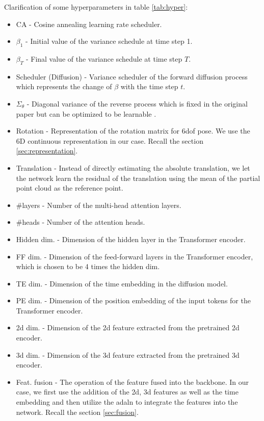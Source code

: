 \documentclass[12pt,DIV14,BCOR12mm,a4paper,footinclude=false,headinclude,parskip=half-,twoside,openright,cleardoublepage=empty,toc=index,bibliography=totoc,listof=totoc]{scrreprt}
\numberwithin{equation}{chapter}
\begin{document}
Clarification of some hyperparameters in table \ref{tab:hyper}:
\begin{itemize}
  \item CA - Cosine annealing learning rate scheduler.
  \item $\beta_{1}$ - Initial value of the variance schedule at time step 1.
  \item $\beta_{T}$ - Final value of the variance schedule at time step $T$.
  \item Scheduler (Diffusion) - Variance scheduler of the forward diffusion process which represents the change of $\beta$ with the time step $t$.
  \item $\Sigma_{\theta}$ - Diagonal variance of the reverse process which is fixed in the original paper \cite{ho2020denoising} but can be optimized to be learnable \cite{nichol2021improved}.
  \item Rotation - Representation of the rotation matrix for \gls{6dof} pose. We use the 6D continuous representation in our case. Recall the section \ref{sec:representation}.
  \item Translation - Instead of directly estimating the absolute translation, we let the network learn the residual of the translation using the mean of the partial point cloud as the reference point.
  \item \#layers - Number of the multi-head attention layers.
  \item \#heads - Number of the attention heads.
  \item Hidden dim. - Dimension of the hidden layer in the Transformer encoder.
  \item FF dim. - Dimension of the feed-forward layers in the Transformer encoder, which is chosen to be 4 times the hidden dim.
  \item TE dim. - Dimension of the time embedding in the diffusion model.
  \item PE dim. - Dimension of the position embedding of the input tokens for the Transformer encoder.
  \item \gls{2d} dim. - Dimension of the \gls{2d} feature extracted from the pretrained \gls{2d} encoder.
  \item \gls{3d} dim. - Dimension of the \gls{3d} feature extracted from the pretrained \gls{3d} encoder.
  \item Feat. fusion - The operation of the feature fused into the backbone. In our case, we first use the addition of the \gls{2d}, \gls{3d} features as well as the time embedding and then utilize the \gls{adaln} to integrate the features into the network. Recall the section \ref{sec:fusion}.
\end{itemize}
\end{document}
